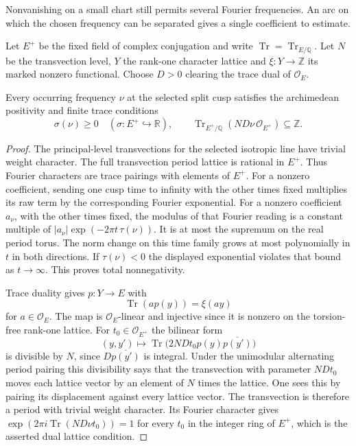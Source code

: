Nonvanishing on a small chart still permits several Fourier frequencies. An arc on which the chosen frequency can be separated gives a single coefficient to estimate.

Let \(E^+\) be the fixed field of complex conjugation and
write \(\operatorname{Tr}=\operatorname{Tr}_{E/\mathbb Q}\).
Let \(N\) be the transvection level, \(Y\) the rank-one
character lattice and \(\xi:Y\to\mathbb Z\) its marked
nonzero functional. Choose \(D>0\) clearing the trace dual
of \(\mathcal O_E\).

\begin{lemma}\label{lem:slice-cm-frequency-lattice}
Every occurring frequency \(\nu\) at the selected split cusp
satisfies the archimedean positivity and finite trace conditions
\[
 \sigma(\nu)\ge0\quad(\sigma:E^+\hookrightarrow\mathbb R),\qquad \operatorname{Tr}_{E^+/\mathbb Q}(ND\nu\,\mathcal O_{E^+})\subseteq\mathbb Z.
\]

\end{lemma}

\begin{proof}
The principal-level transvections for the selected isotropic
line have trivial weight character. The full transvection
period lattice is rational in \(E^+\). Thus Fourier characters
are trace pairings with elements of \(E^+\). For a nonzero
coefficient, sending one cusp time to infinity with the other
times fixed multiplies its raw term by the corresponding Fourier
exponential. For a nonzero coefficient \(a_\nu\), with the
other times fixed, the modulus of that Fourier reading is a
constant multiple of
\(|a_\nu|\exp(-2\pi t\,\tau(\nu))\).
It is at most the supremum on the real period torus.
The norm change on this time family grows at most polynomially
in \(t\) in both directions. If \(\tau(\nu)<0\) the displayed
exponential violates that bound as \(t\to\infty\).
This proves total nonnegativity.

Trace duality gives
\(p:Y\to E\) with 
\[
  \operatorname{Tr}(a p(y))=\xi(ay)
\]
 for
\(a\in\mathcal O_E\). The map is \(\mathcal O_E\)-linear and
injective since it is nonzero on the torsion-free rank-one
lattice. For \(t_0\in\mathcal O_{E^+}\) the
bilinear form
\[
  (y,y')\longmapsto
  \operatorname{Tr}\bigl(2NDt_0 p(y)\overline{p(y')}\bigr)
\]
is divisible by \(N\), since \(D\overline{p(y')}\) is integral.
Under the unimodular alternating period pairing this divisibility
says that the transvection with parameter \(NDt_0\) moves each
lattice vector by an element of \(N\) times the lattice. One sees
this by pairing its displacement against every lattice vector.
The transvection is therefore a period with trivial weight
character. Its Fourier character gives
\(\exp(2\pi i\operatorname{Tr}(ND\nu t_0))=1\) for every \(t_0\)
in the integer ring of \(E^+\), which is the asserted dual
lattice condition.
\end{proof}

